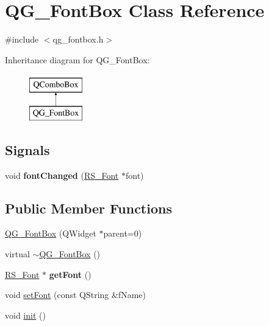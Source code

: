 \hypertarget{classQG__FontBox}{\section{Q\-G\-\_\-\-Font\-Box Class Reference}
\label{classQG__FontBox}
}


{\ttfamily \#include $<$qg\-\_\-fontbox.\-h$>$}

Inheritance diagram for Q\-G\-\_\-\-Font\-Box\-:\begin{figure}[H]
\begin{center}
\leavevmode
\includegraphics[height=2.000000cm]{classQG__FontBox}
\end{center}
\end{figure}
\subsection*{Signals}
\begin{DoxyCompactItemize}
\item 
\hypertarget{classQG__FontBox_a1ae2c49144552a7dabdde5daee379f00}{void {\bfseries font\-Changed} (\hyperlink{classRS__Font}{R\-S\-\_\-\-Font} $\ast$font)}\label{classQG__FontBox_a1ae2c49144552a7dabdde5daee379f00}

\end{DoxyCompactItemize}
\subsection*{Public Member Functions}
\begin{DoxyCompactItemize}
\item 
\hyperlink{classQG__FontBox_ad8859a3697e0bc91d2b4b57fca7f4107}{Q\-G\-\_\-\-Font\-Box} (Q\-Widget $\ast$parent=0)
\item 
virtual \hyperlink{classQG__FontBox_ade05724f040da1194961f8fda944b5f7}{$\sim$\-Q\-G\-\_\-\-Font\-Box} ()
\item 
\hypertarget{classQG__FontBox_a0fe90cd4454d6d3386fd792ea4151dd3}{\hyperlink{classRS__Font}{R\-S\-\_\-\-Font} $\ast$ {\bfseries get\-Font} ()}\label{classQG__FontBox_a0fe90cd4454d6d3386fd792ea4151dd3}

\item 
void \hyperlink{classQG__FontBox_a948b8ede7b79e9923b7ed3fa164f93cb}{set\-Font} (const Q\-String \&f\-Name)
\item 
void \hyperlink{classQG__FontBox_a4fe7c5a638891092843c859f345b621d}{init} ()
\end{DoxyCompactItemize}


